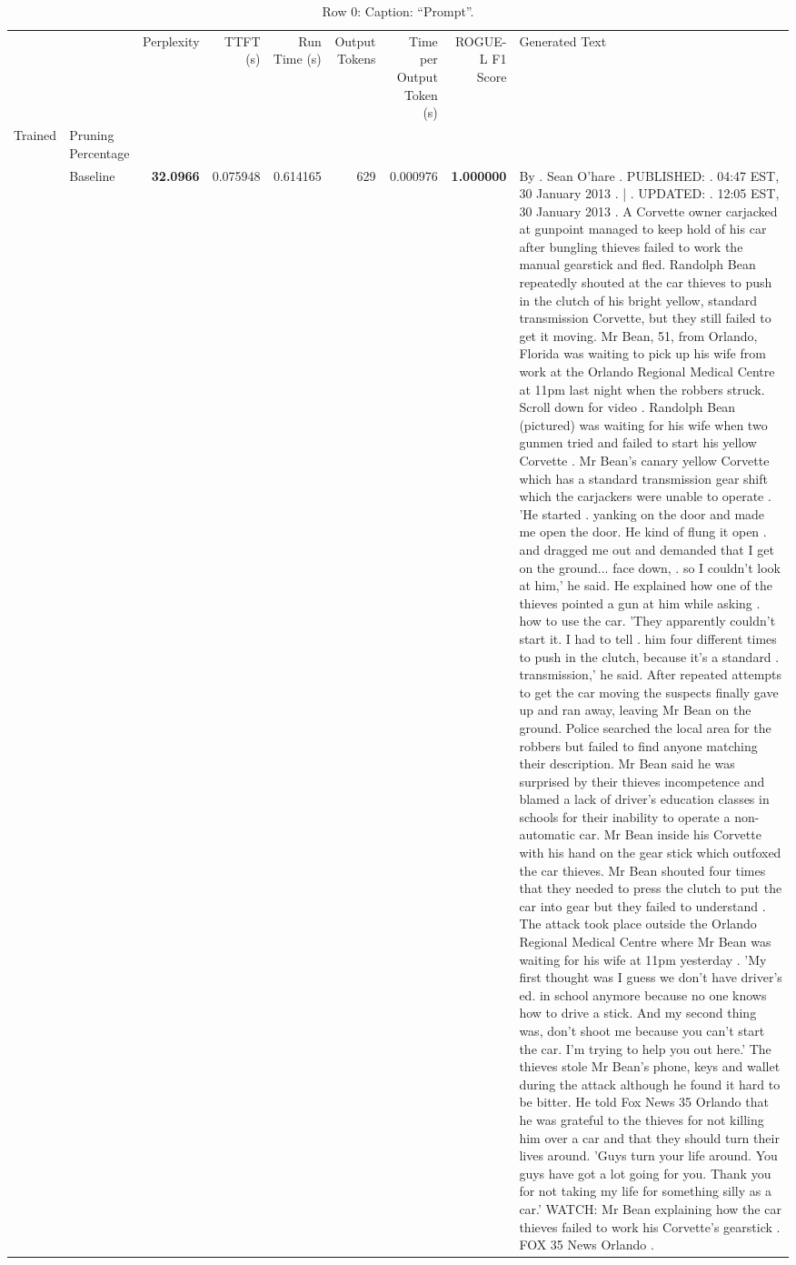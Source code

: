 \begin{table}[H]
\centering
\caption{Row 0: Caption: ``Prompt''.}
\label{tab:evaluation-pipeline-0}
\begin{tabular}{llrrrrrrl}
\toprule
 &  & Perplexity & TTFT (s) & Run Time (s) & Output Tokens & Time per Output Token (s) & ROGUE-L F1 Score & Generated Text \\
Trained & Pruning Percentage &  &  &  &  &  &  &  \\
\midrule
 & Baseline & \bfseries 32.0966 & 0.075948 & 0.614165 & 629 & 0.000976 & \bfseries 1.000000 & By . Sean O'hare . PUBLISHED: . 04:47 EST, 30 January 2013 . | . UPDATED: . 12:05 EST, 30 January 2013 . A Corvette owner carjacked at gunpoint managed to keep hold of his car after bungling thieves failed to work the manual gearstick and fled. Randolph Bean repeatedly shouted at the car thieves to push in the clutch of his bright yellow, standard transmission Corvette, but they still failed to get it moving. Mr Bean, 51, from Orlando, Florida was waiting to pick up his wife from work at the Orlando Regional Medical Centre at 11pm last night when the robbers struck. Scroll down for video . Randolph Bean (pictured) was waiting for his wife when two gunmen tried and failed to start his yellow Corvette . Mr Bean's canary yellow Corvette which has a standard transmission gear shift which the carjackers were unable to operate . 'He started . yanking on the door and made me open the door. He kind of flung it open . and dragged me out and demanded that I get on the ground... face down, . so I couldn't look at him,' he said. He explained how one of the thieves pointed a gun at him while asking . how to use the car. 'They apparently couldn't start it. I had to tell . him four different times to push in the clutch, because it's a standard . transmission,' he said. After repeated attempts to get the car moving the suspects finally gave up and ran away, leaving Mr Bean on the ground. Police searched the local area for the robbers but failed to find anyone matching their description. Mr Bean said he was surprised by their thieves incompetence and blamed a lack of driver's education classes in schools for their inability to operate a non-automatic car. Mr Bean inside his Corvette with his hand on the gear stick which outfoxed the car thieves. Mr Bean shouted four times that they needed to press the clutch to put the car into gear but they failed to understand . The attack took place outside the Orlando Regional Medical Centre where Mr Bean was waiting for his wife at 11pm yesterday . 'My first thought was I guess we don't have driver's ed. in school anymore because no one knows how to drive a stick. And my second thing was, don't shoot me because you can't start the car. I'm trying to help you out here.' The thieves stole Mr Bean's phone, keys and wallet during the attack although he found it hard to be bitter. He told Fox News 35 Orlando that he was grateful to the thieves for not killing him over a car and that they should turn their lives around. 'Guys turn your life around. You guys have got a lot going for you. Thank you for not taking my life for something silly as a car.' WATCH: Mr Bean explaining how the car thieves failed to work his Corvette's gearstick . FOX 35 News Orlando .  \\

\end{tabular}
\end{table}
